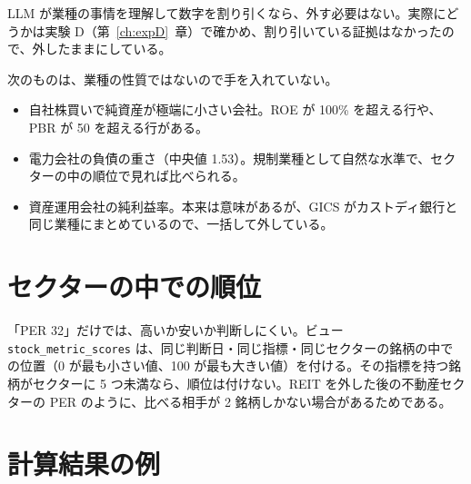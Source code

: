 \documentclass[xelatex,ja=standard,jafont=hiragino-pron,a4paper,10pt]{bxjsreport}
\newcommand{\code}[1]{\texttt{#1}}
\newcommand{\chapref}[1]{第~\ref{#1}~章}
\begin{document}
LLM が業種の事情を理解して数字を割り引くなら、外す必要はない。実際にどうかは実験 D（\chapref{ch:expD}）で確かめ、割り引いている証拠はなかったので、外したままにしている。

次のものは、業種の性質ではないので手を入れていない。

\begin{itemize}
\item 自社株買いで純資産が極端に小さい会社。ROE が 100\% を超える行や、PBR が 50 を超える行がある。
\item 電力会社の負債の重さ（中央値 1.53）。規制業種として自然な水準で、セクターの中の順位で見れば比べられる。
\item 資産運用会社の純利益率。本来は意味があるが、GICS がカストディ銀行と同じ業種にまとめているので、一括して外している。
\end{itemize}

\section{セクターの中での順位}

「PER 32」だけでは、高いか安いか判断しにくい。ビュー \code{stock\_metric\_scores} は、同じ判断日・同じ指標・同じセクターの銘柄の中での位置（0 が最も小さい値、100 が最も大きい値）を付ける。その指標を持つ銘柄がセクターに 5 つ未満なら、順位は付けない。REIT を外した後の不動産セクターの PER のように、比べる相手が 2 銘柄しかない場合があるためである。

\section{計算結果の例}
\end{document}
